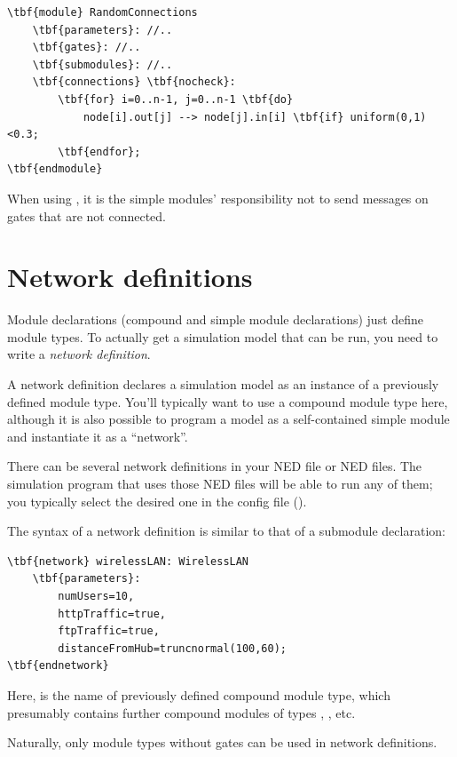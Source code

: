 \begin{Verbatim}[commandchars=\\\{\}]
\tbf{module} RandomConnections
    \tbf{parameters}: //..
    \tbf{gates}: //..
    \tbf{submodules}: //..
    \tbf{connections} \tbf{nocheck}:
        \tbf{for} i=0..n-1, j=0..n-1 \tbf{do}
            node[i].out[j] --> node[j].in[i] \tbf{if} uniform(0,1)<0.3;
        \tbf{endfor};
\tbf{endmodule}
\end{Verbatim}

When using , it is the
simple modules' responsibility not to send messages on gates
that are not connected.


\section{Network definitions}
\label{sec:ch-ned-lang:network}

Module declarations (compound and simple module declarations)
just define module types. To actually get a simulation model that
can be run, you need to write a \textit{network definition}.

A network definition declares a simulation model as an instance
of a previously defined module type. You'll typically want to use
a compound module type here, although it is also possible to
program a model as a self-contained simple module and instantiate it
as a ``network''.

There can be several network definitions in your NED file or NED files.
The simulation program that uses those NED files will be
able to run any of them; you typically select the desired one
in the config file ().

The syntax of a network definition is similar to that of a submodule
declaration:

\begin{Verbatim}[commandchars=\\\{\}]
\tbf{network} wirelessLAN: WirelessLAN
    \tbf{parameters}:
        numUsers=10,
        httpTraffic=true,
        ftpTraffic=true,
        distanceFromHub=truncnormal(100,60);
\tbf{endnetwork}
\end{Verbatim}

Here,  is the name of previously defined
compound module type, which presumably contains further
compound modules of types , , etc.

Naturally, only module types without gates can
be used in network definitions.

